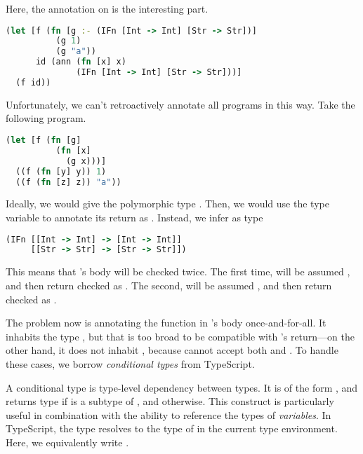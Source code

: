 Here, the annotation on  is the interesting part.

\begin{lstlisting}[language=Clojure]
(let [f (fn [g :- (IFn [Int -> Int] [Str -> Str])]
          (g 1)
          (g "a"))
      id (ann (fn [x] x)
              (IFn [Int -> Int] [Str -> Str]))]
  (f id))
\end{lstlisting}

Unfortunately, we can't retroactively annotate all programs in this way.
Take the following program.

\begin{lstlisting}[language=Clojure]
(let [f (fn [g]
          (fn [x]
            (g x)))]
  ((f (fn [y] y)) 1)
  ((f (fn [z] z)) "a"))
\end{lstlisting}

Ideally, we would give  the polymorphic type
.
Then, we would use the type variable to annotate its return
as \clj{[a -> a]}.
Instead, we infer  as type

\begin{lstlisting}[language=Clojure]
(IFn [[Int -> Int] -> [Int -> Int]]
     [[Str -> Str] -> [Str -> Str]])
\end{lstlisting}

This means that 's body will be checked twice.
The first time,  will be assumed ,
and then return checked as .
The second,  will be assumed ,
and then return checked as .

The problem now is annotating the function in 's body once-and-for-all.
It inhabits the type ,
but that is too broad to be compatible with 's return---on the other hand,
it does not inhabit ,
because  cannot accept both  and .
To handle these cases, we borrow \emph{conditional types} from TypeScript.

A conditional type is type-level dependency between types.
It is of the form ,
and returns type  if  is a subtype of ,
and  otherwise.
This construct is particularly useful in combination with
the ability to reference the types of \emph{variables}.
In TypeScript, the type  resolves to the type of 
in the current type environment. Here, we equivalently write .

